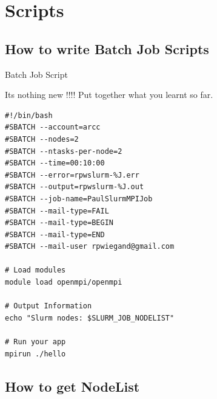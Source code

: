 \documentclass[10pt,compress]{beamer}
\begin{document}
\section{Scripts}
\subsection{How to write Batch Job Scripts}
\begin{frame}[fragile]{Batch Job Script}

  Its nothing new !!!! Put together what you learnt so far.
  
  {\scriptsize
   \begin{verbatim}
#!/bin/bash
#SBATCH --account=arcc
#SBATCH --nodes=2
#SBATCH --ntasks-per-node=2
#SBATCH --time=00:10:00
#SBATCH --error=rpwslurm-%J.err
#SBATCH --output=rpwslurm-%J.out
#SBATCH --job-name=PaulSlurmMPIJob
#SBATCH --mail-type=FAIL
#SBATCH --mail-type=BEGIN
#SBATCH --mail-type=END
#SBATCH --mail-user rpwiegand@gmail.com

# Load modules
module load openmpi/openmpi

# Output Information
echo "Slurm nodes: $SLURM_JOB_NODELIST"

# Run your app
mpirun ./hello

  \end{verbatim}
}
\end{frame}

\subsection{How to get NodeList}
\end{document}
